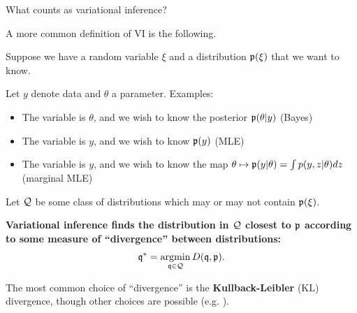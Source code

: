 

\begin{frame}{What counts as variational inference?}

A more common definition of VI is the following.

Suppose we have a random variable $\xi$ and a distribution $\mathfrak{p}(\xi)$
that we want to know.

Let $y$ denote data and $\theta$ a parameter. Examples:
\begin{itemize}
    \item The variable is $\theta$, and we wish to know the posterior
        $\mathfrak{p}(\theta | y)$ (Bayes)
    \item The variable is $y$, and we wish to know $\mathfrak{p}(y)$ (MLE)
    \item The variable is $y$, and we wish to know the map
        $\theta \mapsto  \mathfrak{p}(y | \theta) = \int p(y, z | \theta)  dz$ (marginal MLE)
\end{itemize}

Let $\mathcal{Q}$ be some class of distributions which may or may not contain
$\mathfrak{p}(\xi)$.



\begin{center}
\textbf{Variational inference finds the distribution in $\mathcal{Q}$
closest to $\mathfrak{p}$ according to some measure of ``divergence''
between distributions:}
%
\begin{align*}
%
\qopt = \argmin{\q \in \qdom} D(\q, \p).
%
\end{align*}
%
\end{center}

The most common choice of ``divergence'' is the \textbf{Kullback-Leibler} (KL)
divergence, though other choices are possible (e.g. \citet{li2016variational,
liu2016stein, ambrogioni2018wasserstein}).

\end{frame}






